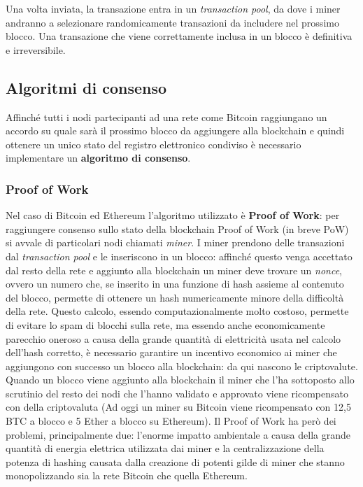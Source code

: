 Una volta inviata, la transazione entra in un \emph{transaction pool}, da dove i miner andranno a selezionare randomicamente transazioni 
da includere nel prossimo blocco. Una transazione che viene correttamente inclusa in un blocco è definitiva e irreversibile.

\subsection{Algoritmi di consenso}

Affinché tutti i nodi partecipanti ad una rete come Bitcoin raggiungano un accordo su quale sarà il prossimo blocco da aggiungere alla blockchain
e quindi ottenere un unico stato del registro elettronico condiviso è necessario implementare un \textbf{algoritmo di consenso}.

\subsubsection{Proof of Work}

Nel caso di Bitcoin ed Ethereum l'algoritmo utilizzato è \textbf{Proof of Work}: per raggiungere consenso sullo stato della blockchain Proof of Work
(in breve PoW) si avvale di particolari nodi chiamati \emph{miner}. I miner prendono delle transazioni dal \emph{transaction pool} e le inseriscono
in un blocco: affinché questo venga accettato dal resto della rete e aggiunto alla blockchain un miner deve trovare un \emph{nonce},
ovvero un numero che, se inserito in una funzione di hash assieme al contenuto del blocco, permette di ottenere un hash numericamente minore
della difficoltà della rete. Questo calcolo, essendo computazionalmente molto costoso, permette di evitare lo spam di blocchi sulla rete, ma essendo
anche economicamente parecchio oneroso a causa della grande quantità di elettricità usata nel calcolo dell'hash corretto, è necessario garantire un incentivo
economico ai miner che aggiungono con successo un blocco alla blockchain: da qui nascono le criptovalute. Quando un blocco viene aggiunto
alla blockchain il miner che l'ha sottoposto allo scrutinio del resto dei nodi che l'hanno validato e approvato viene ricompensato con della
criptovaluta (Ad oggi un miner su Bitcoin viene ricompensato con 12,5 BTC a blocco e 5 Ether a blocco su Ethereum).
Il Proof of Work ha però dei problemi, principalmente due: l'enorme impatto ambientale a causa della grande quantità
di energia elettrica utilizzata dai miner e la centralizzazione della potenza di hashing causata dalla creazione
di potenti gilde di miner che stanno monopolizzando sia la rete Bitcoin che quella Ethereum.

